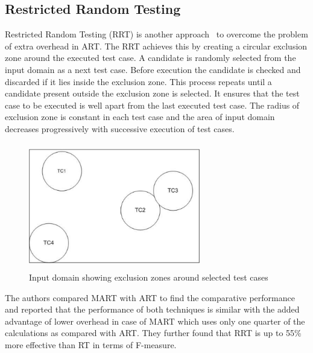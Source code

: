 \subsection{Restricted Random Testing}
Restricted Random Testing (RRT) is another approach~\cite{chan2003normalized} to overcome the problem of extra overhead in ART. The RRT achieves this by creating a circular exclusion zone around the executed test case. A candidate is randomly selected from the input domain as a next test case. Before execution the candidate is checked and discarded if it lies inside the exclusion zone. This process repeats until a candidate present outside the exclusion zone is selected. It ensures that the test case to be executed is well apart from the last executed test case. The radius of exclusion zone is constant in each test case and the area of input domain decreases progressively with successive execution of test cases.
\bigskip
\bigskip
\begin{figure}[h]
	\centering
	\includegraphics[width= 7.5cm, height = 5.5cm]{chapter2/RRT.pdf}
	\bigskip
	\caption{Input domain showing exclusion zones around selected test cases}
\end{figure}
\bigskip

The authors compared MART with ART to find the comparative performance and reported that the performance of both techniques is similar with the added advantage of lower overhead in case of MART which uses only one quarter of the calculations as compared with ART. %
They further found that RRT is up to 55\% more effective than RT in terms of F-measure.




